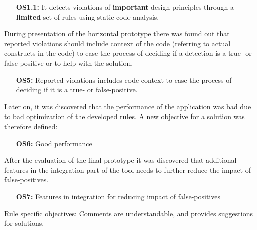 \documentclass{report}
\begin{document}
\begin{itemize}
    \item [\textbf{OS1.1:}] It detects violations of \textbf{important} design principles through a \textbf{limited} set of rules using static code analysis.
\end{itemize}

During presentation of the horizontal prototype there was found out that reported violations should include context of the code (referring to actual constructs in the code) to ease the process of deciding if a detection is a true- or false-positive or to help with the solution. 

\begin{itemize}
        \item [\textbf{OS5:}] Reported violations includes code context to ease the process of deciding if it is a true- or false-positive. 
\end{itemize}

Later on, it was discovered that the performance of the application was bad due to bad optimization of the developed rules. A new objective for a solution was therefore defined:
\begin{itemize}
    \item [\textbf{OS6:}] Good performance
\end{itemize}

After the evaluation of the final prototype it was discovered that additional features in the integration part of the tool needs to further reduce the impact of false-positives. 
\begin{itemize}
    \item [\textbf{OS7:}] Features in integration for reducing impact of false-positives
\end{itemize}






Rule specific objectives: 
Comments are understandable, and provides suggestions for solutions.
\end{document}
